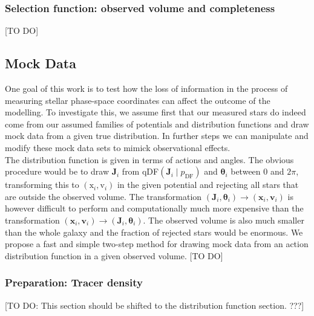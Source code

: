\documentclass[12pt,preprint]{aastex}
\newcommand{\vect}[1]{\boldsymbol{#1}} %
\begin{document}
\subsubsection{Selection function: observed volume and completeness}

[TO DO]

\subsection{Mock Data}

One goal of this work is to test how the loss of information in the process of measuring stellar phase-space coordinates can affect the outcome of the modelling. To investigate this, we assume first that our measured stars do indeed come from our assumed families of potentials and distribution functions and draw mock data from a given true distribution. In further steps we can manipulate and modify these mock data sets to mimick observational effects.\\
The distribution function is given in terms of actions and angles. The obvious procedure would be to draw $\vect{J}_i$ from qDF$(\vect{J}_i \mid p_\text{DF})$ and $\vect{\theta}_i$ between 0 and $2\pi$, transforming this to $(\text{x}_i,\text{v}_i)$ in the given potential and rejecting all stars that are outside the observed volume. The transformation $(\vect{J}_i,\vect{\theta}_i) \longrightarrow (\vect{x}_i,\vect{v}_i)$ is however difficult to perform and computationally much more expensive than the transformation $(\vect{x}_i,\vect{v}_i) \longrightarrow (\vect{J}_i,\vect{\theta}_i)$. The observed volume is also much smaller than the whole galaxy and the fraction of rejected stars would be enormous. We propose a fast and simple two-step method for drawing mock data from an action distribution function in a given observed volume.
[TO DO]

\subsubsection{Preparation: Tracer density} \label{sec:density}

[TO DO: This section should be shifted to the distribution function section. ???]
\end{document}
